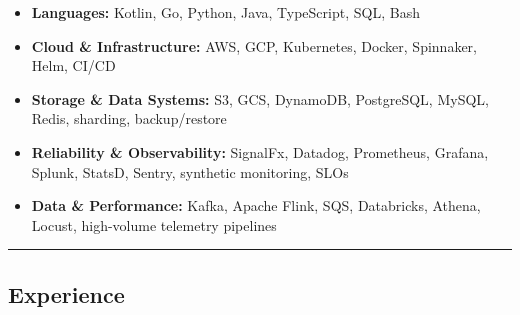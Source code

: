 \documentclass[11pt,letterpaper]{article}
\newcommand{\accentrule}{{\color{accent}\hrule}}
\begin{document}
\begin{itemize}[leftmargin=1em,noitemsep]
        \item \textbf{Languages:} Kotlin, Go, Python, Java, TypeScript, SQL, Bash
        \item \textbf{Cloud \& Infrastructure:} AWS, GCP, Kubernetes, Docker, Spinnaker, Helm, CI/CD
        \item \textbf{Storage \& Data Systems:} S3, GCS, DynamoDB, PostgreSQL, MySQL, Redis, sharding, backup/restore
        \item \textbf{Reliability \& Observability:} SignalFx, Datadog, Prometheus, Grafana, Splunk, StatsD, Sentry, synthetic monitoring, SLOs
        \item \textbf{Data \& Performance:} Kafka, Apache Flink, SQS, Databricks, Athena, Locust, high-volume telemetry pipelines
\end{itemize}

\accentrule
\vspace{-1em}
\subsection*{\Large \textcolor{accent}{Experience}}
\end{document}
